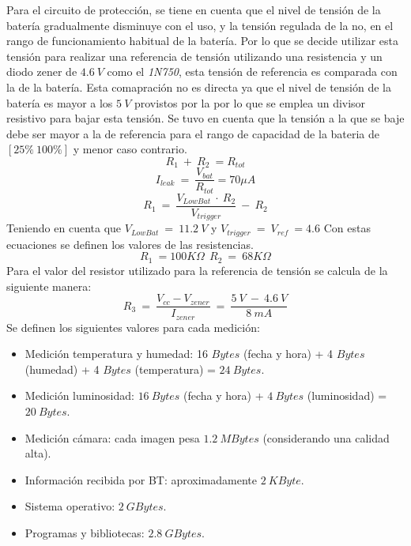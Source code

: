 Para el circuito de protección, se tiene en cuenta que el nivel de tensión de la batería gradualmente disminuye con el uso, y la tensión regulada de la \rspi no, en el rango de funcionamiento habitual de la batería. Por lo que se decide utilizar esta tensión para realizar una referencia de tensión utilizando una resistencia y un diodo zener de $4.6 \ V$ como el \textit{1N750}, esta tensión de referencia es comparada con la de la  batería. Esta comapración no es directa ya que el nivel de tensión de la batería es mayor a los $5 \ V$ provistos por la \rspi por lo que se emplea un divisor resistivo para bajar esta tensión. Se tuvo en cuenta que la tensión a la que se baje debe ser mayor a la de referencia para el rango de capacidad de la bateria de $[25\% ~ 100\%]$ y menor caso contrario. 
\begin{equation}
R_1 \ +\ R_2 \ = R_{tot}
\end{equation}
\begin{equation}
I_{leak} \ = \ \frac{V_{bat}}{R_{tot}}  = 70 \mu A
\end{equation}
\begin{equation}
R_1 \ = \ \frac{V_{LowBat} \ \cdot \ R_2}{V_{trigger}} \ - \ R_2
\end{equation}
Teniendo en cuenta que $V_{LowBat} \ = \ 11.2 \ V$ y $V_{trigger} \ = \ V_{ref} \ = 4.6$
Con estas ecuaciones se definen los valores de las resistencias.
\begin{equation}
R_1 \ =100K\Omega  \ \ R_2 \  = \ 68K\Omega 
\end{equation}
Para el valor del resistor utilizado para la referencia de tensión se calcula de la siguiente manera:
\begin{equation}
	R_3 \ = \  \frac{V_{cc}-V_{zener}}{I_{zener}} \ = \  \frac{5 \ V \ - \ 4.6 \ V}{8 \ mA}
\end{equation}
Se definen los siguientes valores para cada medición:
\begin{itemize}
	\item Medición temperatura y humedad: 16 $Bytes$ (fecha y hora) + 4 $Bytes$ (humedad) + 4 $Bytes$ (temperatura) = $24 \ Bytes$.
	\item Medición luminosidad: $16 \ Bytes$ (fecha y hora) + $4 \ Bytes$ (luminosidad) = $20 \ Bytes$.
	\item Medición cámara: cada imagen pesa $1.2 \ MBytes$ \cite{ref:rpicam} (considerando una calidad alta).
	\item Información recibida por BT: aproximadamente $2 \ KByte$.
	\item Sistema operativo: $2 \ GBytes$.
	\item Programas y bibliotecas: $2.8 \ GBytes$.
\end{itemize}

